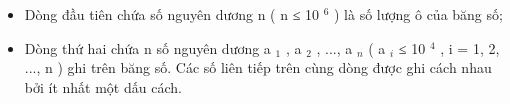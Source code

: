 \begin{itemize}
	\item Dòng đầu tiên chứa số nguyên dương n ( n ≤ 10 $^ 6 $ ) là số lượng ô của băng số;
	\item Dòng thứ hai chứa n số nguyên dương a $_ 1 $ , a $_ 2 $ , ..., a $_ n $ ( a $_ i $ ≤ 10 $^ 4 $ , i = 1, 2, ..., n ) ghi trên băng số. Các số liên tiếp trên cùng dòng được ghi cách nhau bởi ít nhất một dấu cách.
\end{itemize}